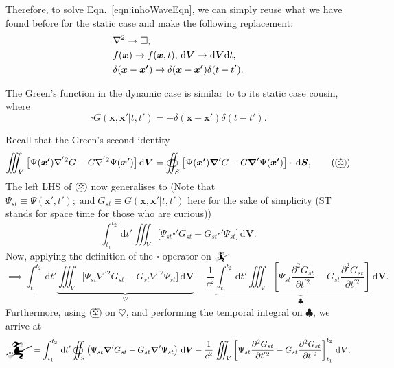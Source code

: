 \documentclass[12pt,english]{article}
\newcommand{\dmr}[1]{\, \mathrm{d}#1} %
\newcommand{\intt}[2]{\int_{#1}^{#2}} %
\renewcommand{\vec}[1]{\boldsymbol{#1}}
\begin{document}
Therefore, to solve Eqn.~\ref{eqn:inhoWaveEqn}, we can simply reuse what we have found before for the static case and make the following replacement:
\begin{subequations}
    \begin{align}
         & \laplacian \to \square,                                                      \\
         & f(\vec{x}) \to f(\vec{x}, t),\dmr{\vec{V}} \to \mathrm{d}\vec{V}\mathrm{d}t, \\
         & \delta(\vec{x}-\vec{x'}) \to \delta(\vec{x}-\vec{x'})\delta(t-t').
    \end{align}
\end{subequations}

The Green's function in the dynamic case is similar to to its static case cousin, where
\begin{equation}
    \square G(\vec{x}, \vec{x'} | t, t') = -\delta(\vec{x} - \vec{x'})\delta(t- t').
\end{equation}

Recall that the Green's second identity
\begin{equation}
    \iiint_V \big[\Psi(\vec{x'}) \nabla^{'2} G - G \nabla^{'2} \Psi(\vec{x'})\big] \dmr{\vec{V}} = \oiint_S \big[\Psi(\vec{x'})\grad'G - G\grad'\Psi(\vec{x'})\big] \cdot \dmr{\vec{S}}, \tag{$\bigpumpkin$}
\end{equation}
The left LHS of $\bigpumpkin$ now generalises to (Note that $\Psi_{st} \equiv \Psi(\vec{x'}, t'); \; \text{and} \; G_{st} \equiv G(\vec{x}, \vec{x'}|t, t')$ here for the sake of simplicity (ST stands for space time for those who are curious))
\begin{equation*}
    \intt{t_1}{t_2}\dmr{t'} \iiint_V \big[ \Psi_{st} \square' G_{st} - G_{st} \square' \Psi_{st} \big]\dmr{\vec{V}}. \tag{$\mathwitch$}
\end{equation*}
Now, applying the definition of the $\square$ operator on $\mathwitch$
\begin{equation*}
    \implies \intt{t_1}{t_2}\dmr{t'}\underbrace{\iiint_V\big[ \Psi_{st} \nabla^{'2}G_{st} - G_{st} \nabla^{'2} \Psi_{st} \big]\dmr{\vec{V}}}_{\heartsuit} - \frac{1}{c^2}\underbrace{\intt{t_1}{t_2}\dmr{t'}\iiint_V \left[\Psi_{st} \frac{\partial^2G_{st}}{\partial t^{'2}} - G_{st} \frac{\partial^2 G_{st}}{\partial t^{'2}} \right]\dmr{\vec{V}}}_{\clubsuit}.
\end{equation*}
Furthermore, using $\bigpumpkin$ on $\heartsuit$, and performing the temporal integral on $\clubsuit$, we arrive at
\small
\begin{equation}
    \mathwitch = \intt{t_1}{t_2}\dmr{t'}\oiint_S\left(\Psi_{st} \grad' G_{st} - G_{st} \grad' \Psi_{st}\right)\dmr{\vec{V}} - \frac{1}{c^2}\iiint_V\left[\Psi_{st} \frac{\partial^2 G_{st}}{\partial t^{'2}} - G_{st} \frac{\partial^2 G_{st}}{\partial t^{'2}}\right]_{t_1}^{t_2}\dmr{\vec{V}}.
\end{equation}
\normalsize
\end{document}
